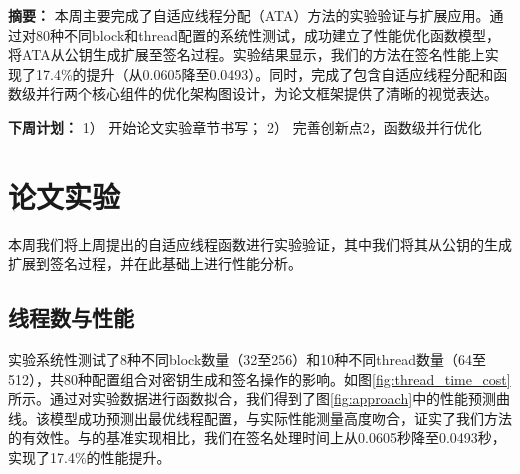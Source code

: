 \documentclass[report]{../../custom}
\begin{document}
\maketitle

\noindent \textbf{摘要：}
本周主要完成了自适应线程分配（ATA）方法的实验验证与扩展应用。通过对80种不同block和thread配置的系统性测试，成功建立了性能优化函数模型，将ATA从公钥生成扩展至签名过程。实验结果显示，我们的方法在签名性能上实现了17.4\%的提升（从0.0605降至0.0493）。同时，完成了包含自适应线程分配和函数级并行两个核心组件的优化架构图设计，为论文框架提供了清晰的视觉表达。
\vskip 0.5cm

\noindent \textbf{下周计划：}
1） 开始论文实验章节书写；
2） 完善创新点2，函数级并行优化

\section{论文实验}

本周我们将上周提出的自适应线程函数进行实验验证，其中我们将其从公钥的生成扩展到签名过程，并在此基础上进行性能分析。

\subsection{线程数与性能}

实验系统性测试了8种不同block数量（32至256）和10种不同thread数量（64至512），共80种配置组合对密钥生成和签名操作的影响。如图\ref{fig:thread_time_cost}所示。通过对实验数据进行函数拟合，我们得到了图\ref{fig:approach}中的性能预测曲线。该模型成功预测出最优线程配置，与实际性能测量高度吻合，证实了我们方法的有效性。与\cite{Wang2025}的基准实现相比，我们在签名处理时间上从0.0605秒降至0.0493秒，实现了17.4\%的性能提升。
\end{document}
